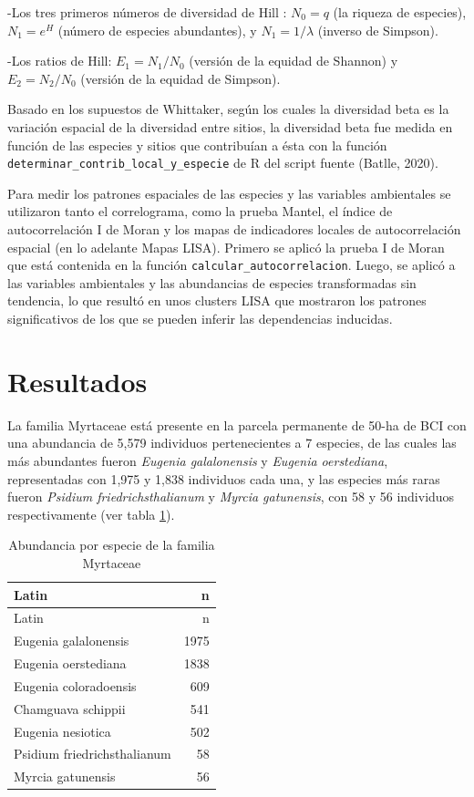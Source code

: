 \documentclass[11pt,]{article}
\begin{document}
-Los tres primeros números de diversidad de Hill : \(N_0 =q\) (la
riqueza de especies), \(N_1 = e^H\) (número de especies abundantes), y
\(N_1 = 1/\)\(\lambda\) (inverso de Simpson).

-Los ratios de Hill: \(E_1 = N_1/N_0\) (versión de la equidad de
Shannon) y \(E_2 = N_2/N_0\) (versión de la equidad de Simpson).

Basado en los supuestos de Whittaker, según los cuales la diversidad
beta es la variación espacial de la diversidad entre sitios, la
diversidad beta fue medida en función de las especies y sitios que
contribuían a ésta con la función
\texttt{determinar\_contrib\_local\_y\_especie} de R del script fuente
(Batlle, 2020).

Para medir los patrones espaciales de las especies y las variables
ambientales se utilizaron tanto el correlograma, como la prueba Mantel,
el índice de autocorrelación I de Moran y los mapas de indicadores
locales de autocorrelación espacial (en lo adelante Mapas LISA). Primero
se aplicó la prueba I de Moran que está contenida en la función
\texttt{calcular\_autocorrelacion}. Luego, se aplicó a las variables
ambientales y las abundancias de especies transformadas sin tendencia,
lo que resultó en unos clusters LISA que mostraron los patrones
significativos de los que se pueden inferir las dependencias inducidas.

\section{Resultados}\label{resultados}

La familia Myrtaceae está presente en la parcela permanente de 50-ha de
BCI con una abundancia de 5,579 individuos pertenecientes a 7 especies,
de las cuales las más abundantes fueron \emph{Eugenia galalonensis} y
\emph{Eugenia oerstediana}, representadas con 1,975 y 1,838 individuos
cada una, y las especies más raras fueron \emph{Psidium
friedrichsthalianum} y \emph{Myrcia gatunensis}, con 58 y 56 individuos
respectivamente (ver tabla \ref{tab:abun_sp}).

\begin{longtable}[]{@{}lr@{}}
\caption{\label{tab:abun_sp}Abundancia por especie de la familia
Myrtaceae}\tabularnewline
\toprule
Latin & n\tabularnewline
\midrule
\endfirsthead
\toprule
Latin & n\tabularnewline
\midrule
\endhead
Eugenia galalonensis & 1975\tabularnewline
Eugenia oerstediana & 1838\tabularnewline
Eugenia coloradoensis & 609\tabularnewline
Chamguava schippii & 541\tabularnewline
Eugenia nesiotica & 502\tabularnewline
Psidium friedrichsthalianum & 58\tabularnewline
Myrcia gatunensis & 56\tabularnewline
\bottomrule
\end{longtable}
\end{document}
